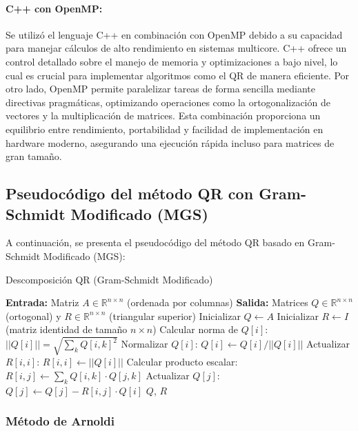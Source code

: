 \documentclass{article}
\begin{document}
\paragraph{C++ con OpenMP:} Se utilizó el lenguaje C++ en combinación con OpenMP debido a su capacidad para manejar cálculos de alto rendimiento en sistemas multicore. C++ ofrece un control detallado sobre el manejo de memoria y optimizaciones a bajo nivel, lo cual es crucial para implementar algoritmos como el QR de manera eficiente. Por otro lado, OpenMP permite paralelizar tareas de forma sencilla mediante directivas pragmáticas, optimizando operaciones como la ortogonalización de vectores y la multiplicación de matrices. Esta combinación proporciona un equilibrio entre rendimiento, portabilidad y facilidad de implementación en hardware moderno, asegurando una ejecución rápida incluso para matrices de gran tamaño.

\newpage

\subsection{Pseudocódigo del método QR con Gram-Schmidt Modificado (MGS)}

A continuación, se presenta el pseudocódigo del método QR basado en Gram-Schmidt Modificado (MGS):

\begin{algorithm}[H]
\caption{Descomposición QR (Gram-Schmidt Modificado)}
\begin{algorithmic}[1]
\State \textbf{Entrada:} Matriz $A \in \mathbb{R}^{n \times n}$ (ordenada por columnas)   
\State \textbf{Salida:} Matrices $Q \in \mathbb{R}^{n \times n}$ (ortogonal) y $R \in \mathbb{R}^{n \times n}$ (triangular superior)
\State Inicializar $Q \gets A$
\State Inicializar $R \gets I$ (matriz identidad de tamaño $n \times n$)
    \State Calcular norma de $Q[i]$: $||Q[i]|| = \sqrt{\sum_k Q[i,k]^2}$
    \State Normalizar $Q[i]$: $Q[i] \gets Q[i] / ||Q[i]||$
    \State Actualizar $R[i,i]$: $R[i,i] \gets ||Q[i]||$
        \State Calcular producto escalar: $R[i,j] \gets \sum_k Q[i,k] \cdot Q[j,k]$
        \State Actualizar $Q[j]$: $Q[j] \gets Q[j] - R[i,j] \cdot Q[i]$
    \EndFor
\EndFor
\State \Return $Q$, $R$
\end{algorithmic}
\end{algorithm}


\subsubsection{Método de Arnoldi}
\end{document}
